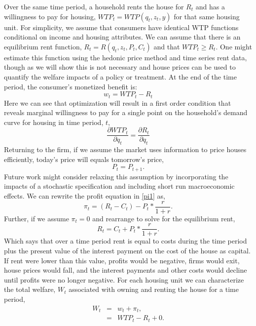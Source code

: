 \documentclass[ecta,nameyear,draft]{econsocart}
\theoremstyle{plain}
\theoremstyle{remark}
\begin{document}
Over the same time period, a household rents the house for $R_t$ and has a willingness to pay for housing, $\mathit{WTP}_t=\mathit{WTP}(q_t,z_t,y)$ for that same housing unit. For simplicity, we assume that consumers have identical WTP functions conditional on income and housing attributes. We can assume that there is an equilibrium rent function, $R_t=R(q_t,z_t,P_t,C_t)$ and that $\mathit{WTP}_t \geq R_t$. One might estimate this function using the hedonic price method and time series rent data, though as we will show this is not necessary and house prices can be used to quantify the welfare impacts of a policy or treatment. 
At the end of the time period, the consumer’s monetized benefit is:
\begin{equation*}
	 w_t=\mathit{WTP}_t-R_t
\end{equation*}
Here we can see that optimization will result in a first order condition that reveals marginal willingness
to pay for a single point on the household’s demand curve for housing in time period, $t$,
\begin{equation}
	\frac{\partial \mathit{WTP}_t}{\partial q_t}=\frac{\partial R_t}{\partial q_t} \label{foc}
\end{equation}
Returning to the firm, if we assume the market uses information to price houses efficiently, today’s price will equals tomorrow’s
price,
\begin{equation*}
	P_t=P_{t+1}.
\end{equation*}
Future work might consider relaxing this assumption by incorporating the impacts of a stochastic
specification and including short run macroeconomic effects.
We can rewrite the profit equation in \ref{pi1} as,
\begin{equation}
	\pi_t=(R_t-C_t)-P_t*\frac{r}{1+r}.\label{pi1.1}
\end{equation}
Further, if we assume $\pi_t=0$ and rearrange to solve for the equilibrium rent,
\begin{equation}
	R_t=C_t+P_t*\frac{r}{1+r}.\label{rent1}
\end{equation}
Which says that over a time period rent is equal to costs during the time period plus the present value of
the interest payment on the cost of the house as capital. If rent were lower than this value, profits
would be negative, firms would exit, house prices would fall, and the interest payments and other costs
would decline until profits were no longer negative.
For each housing unit we can characterize the total welfare, $W_t$ associated with owning and renting the house for a time period,
\begin{eqnarray*}
	W_t & = & w_t+\pi_t,\\
	& = & \mathit{WTP}_t-R_t+0.
\end{eqnarray*}
\end{document}
